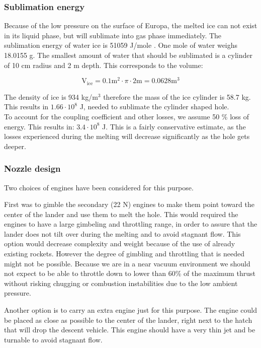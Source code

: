 \subsubsection{Sublimation energy}

Because of the low pressure on the surface of Europa, the melted ice can not exist in its liquid phase, but will sublimate into gas phase immediately. The sublimation energy of water ice is 51059 J/mole \cite{water_prop}. One mole of water weighs 18.0155 g. The smallest amount of water that should be sublimated is a cylinder of 10 cm radius and 2 m depth. This corresponds to the volume:

\begin{equation}
\mathrm{V_{ice}}=0.1 \mathrm{m}^2 \cdot \pi \cdot 2 \mathrm{m} = 0.0628 \mathrm{m}^3
\end{equation}

The density of ice is 934 kg/m$^3$ therefore the mass of the ice cylinder is 58.7 kg. This results in $1.66\cdot 10^8$ J, needed to sublimate the cylinder shaped hole. \\

To account for the coupling coefficient and other losses, we assume 50 \% loss of energy. This results in: $3.4 \cdot 10^8$ J. This is a fairly conservative estimate, as the losses experienced during the melting will decrease significantly as the hole gets deeper. 




\subsubsection{Nozzle design}

Two choices of engines have been considered for this purpose. 

First was to gimble the secondary (22 N) engines to make them point toward the center of the lander and use them to melt the hole. This would required the engines to have a large gimbeling and throttling range, in order to assure that the lander does not tilt over during the melting and to avoid stagnant flow. This option would decrease complexity and weight because of the use of already existing rockets. However the degree of gimbling and throttling that is needed might not be possible. Because we are in a near vacuum environment we should not expect to be able to throttle down to lower than 60\% of the maximum thrust without risking chugging or combustion instabilities due to the low ambient pressure.

Another option is to carry an extra engine just for this purpose. The engine could be placed as close as possible to the center of the lander, right next to the hatch that will drop the descent vehicle. This engine should have a very thin jet and be turnable to avoid stagnant flow. \\

